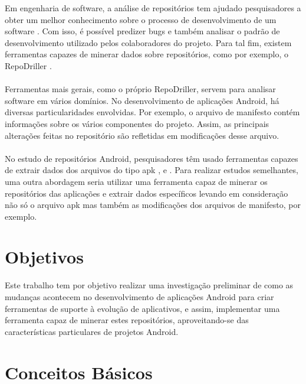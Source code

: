 \documentclass[a4paper,12pt]{article}
\begin{document}
Em engenharia de software, a análise de repositórios tem ajudado pesquisadores a
obter um melhor conhecimento sobre o processo de desenvolvimento de um
software \cite{miningGit}. Com isso, é possível predizer bugs e também analisar o padrão de
desenvolvimento utilizado pelos colaboradores do projeto. Para tal fim, existem
ferramentas capazes de minerar dados sobre repositórios, como por exemplo, o
RepoDriller \cite{repodriller}.\\
\\
Ferramentas mais gerais, como o próprio RepoDriller, servem para analisar
software em vários domínios. No desenvolvimento de aplicações Android, há
diversas particularidades envolvidas. Por exemplo, o arquivo de manifesto contém
informações sobre os vários componentes do projeto. Assim, as principais
alterações feitas no repositório são refletidas em modificações desse arquivo.\\
\\
No estudo de repositórios Android, pesquisadores têm usado ferramentas capazes
de extrair dados dos arquivos do tipo apk \cite{Calciati}, \cite{WhoAdded} e \cite{YLyu}. Para realizar estudos
semelhantes, uma outra abordagem seria utilizar uma ferramenta capaz de
minerar os repositórios das aplicações e extrair dados específicos levando em
consideração não só o arquivo apk mas também as modificações dos arquivos de
manifesto, por exemplo.\\


\newpage
\section{Objetivos}

Este trabalho tem por objetivo realizar uma investigação preliminar de como as
mudanças acontecem no desenvolvimento de aplicações Android para criar
ferramentas de suporte à evolução de aplicativos, e assim, implementar uma
ferramenta capaz de minerar estes repositórios, aproveitando-se das
características particulares de projetos Android.\\


\newpage

\section{Conceitos Básicos}
\end{document}
